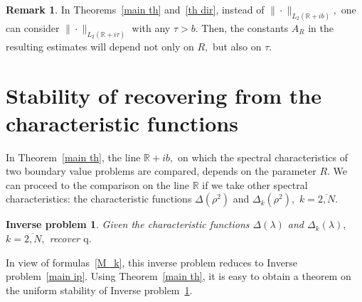 \documentclass[a4paper, 12pt] {article}
\theoremstyle{plain}
\newtheorem{IP}{\indent Inverse problem}
\theoremstyle{remark}
\theoremstyle{plain}
\theoremstyle{definition}
\newtheorem{remark}{\indent Remark}
\numberwithin{equation}{section}
\begin{document}
\begin{remark}
In Theorems~\ref{main th} and~\ref{th dir}, instead of $\| \cdot \|_{L_2({\mathbb R} + ib)},$ one can consider $\| \cdot \|_{L_2({\mathbb R} + i\tau)}$ with any $\tau > b.$ Then, the constants $A_R$ in the resulting estimates will depend not only on $R,$ but also on $\tau.$
\end{remark}

\section{Stability of recovering from the characteristic functions}
\label{char}

In Theorem~\ref{main th}, the line ${\mathbb{R}}+ib,$ on which the spectral characteristics of two boundary value problems are compared, depends on the parameter $R.$
We can proceed to the comparison on the line $\mathbb R$ if we take other spectral characteristics: the characteristic functions $\Delta(\rho^2)$ and $\Delta_k(\rho^2),$ $k=\overline{2, N}.$

\begin{IP} \label{sec ip}
Given the characteristic functions $\Delta(\lambda)$ and $\Delta_k(\lambda),$ $k=\overline{2, N},$ recover $\mathrm{q}.$
\end{IP}
In view of formulas~\eqref{M_k}, this inverse problem reduces to Inverse problem~\ref{main ip}. Using Theorem~\ref{main th}, it is easy to obtain a theorem on the uniform stability of Inverse problem~\ref{sec ip}.
\end{document}
